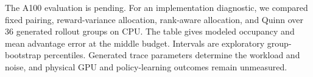 The A100 evaluation is pending. For an implementation diagnostic, we compared fixed pairing, reward-variance allocation, rank-aware allocation, and Quinn over 36 generated rollout groups on CPU. The table gives modeled occupancy and mean advantage error at the middle budget. Intervals are exploratory group-bootstrap percentiles. Generated trace parameters determine the workload and noise, and physical GPU and policy-learning outcomes remain unmeasured.


